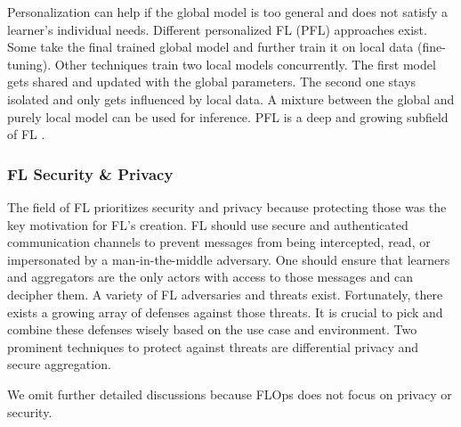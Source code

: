 Personalization can help if the global model is too general and does not satisfy a learner's individual needs.
Different personalized FL (PFL) approaches exist.
Some take the final trained global model and further train it on local data (fine-tuning).
Other techniques train two local models concurrently.
The first model gets shared and updated with the global parameters.
The second one stays isolated and only gets influenced by local data.
A mixture between the global and purely local model can be used for inference.
PFL is a deep and growing subfield of FL \cite{book:fl,hpfl_over_massive_mobile_edge_computing_networks, paper:adaptive_exper_models_for_pfl}.

\subsubsection{FL Security \& Privacy}
The field of FL prioritizes security and privacy because protecting those was the key motivation for FL's creation.
FL should use secure and authenticated communication channels to prevent messages from being intercepted, read, or impersonated by a man-in-the-middle adversary.
One should ensure that learners and aggregators are the only actors with access to those messages and can decipher them.
A variety of FL adversaries and threats exist.
Fortunately, there exists a growing array of defenses against those threats.
It is crucial to pick and combine these defenses wisely based on the use case and environment.
Two prominent techniques to protect against threats are differential privacy and secure aggregation. \cite{book:fl}

We omit further detailed discussions because FLOps does not focus on privacy or security.
